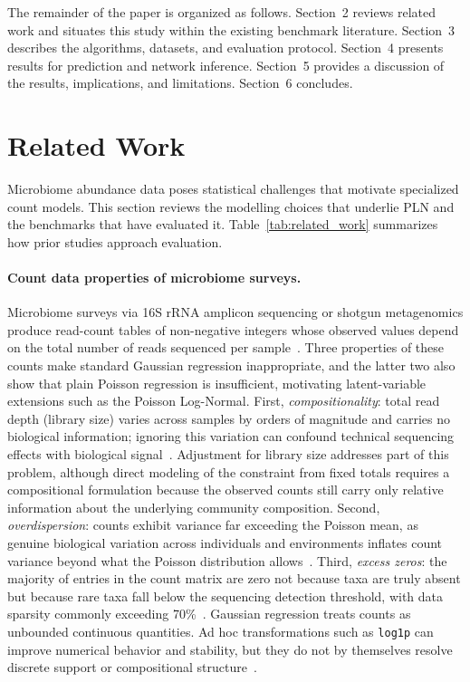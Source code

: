 \documentclass[USenglish]{article}
\theoremstyle{dgthm}
\begin{document}
The remainder of the paper is organized as follows.
Section~2 reviews related work and situates this study within the existing benchmark literature.
Section~3 describes the algorithms, datasets, and evaluation protocol.
Section~4 presents results for prediction and network inference.
Section~5 provides a discussion of the results, implications, and limitations.
Section~6 concludes.

\section{Related Work}

Microbiome abundance data poses statistical challenges that motivate specialized count models. 
This section reviews the modelling choices that underlie PLN and the benchmarks that have evaluated it.
Table~\ref{tab:related_work} summarizes how prior studies approach evaluation.

\paragraph{Count data properties of microbiome surveys.}
Microbiome surveys via 16S rRNA amplicon sequencing or shotgun metagenomics produce read-count tables of non-negative integers whose observed values depend on the total number of reads sequenced per sample~\citep{HMP2012, Thompson2017, Xia2023}.
Three properties of these counts make standard Gaussian regression inappropriate, and the latter two also show that plain Poisson regression is insufficient, motivating latent-variable extensions such as the Poisson Log-Normal.
First, \emph{compositionality}: total read depth (library size) varies across samples by orders of magnitude and carries no biological information; ignoring this variation can confound technical sequencing effects with biological signal~\citep{mcmurdie2014waste}.
Adjustment for library size addresses part of this problem, although direct modeling of the constraint from fixed totals requires a compositional formulation because the observed counts still carry only relative information about the underlying community composition.
Second, \emph{overdispersion}: counts exhibit variance far exceeding the Poisson mean, as genuine biological variation across individuals and environments inflates count variance beyond what the Poisson distribution allows~\citep{zhang2017nbmm}. 
Third, \emph{excess zeros}: the majority of entries in the count matrix are zero not because taxa are truly absent but because rare taxa fall below the sequencing detection threshold, with data sparsity commonly exceeding 70\%~\citep{Batardiere2025ZIPLN, Kodikara2022}.
Gaussian regression treats counts as unbounded continuous quantities.
Ad hoc transformations such as \texttt{log1p} can improve numerical behavior and stability, but they do not by themselves resolve discrete support or compositional structure~\citep{booeshaghi2021log1p}.
\end{document}
